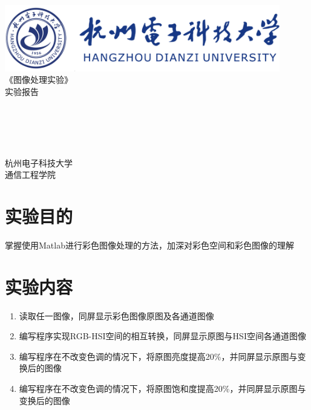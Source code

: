 \documentclass[a4paper]{ctexart}
\begin{document}
  \begin{titlepage}
      \songti
      \begin{center}
        \includegraphics[width=0.9\textwidth]{../HDU.png}\\
        \vspace*{2.5cm}
        {\fontsize{24pt}{0}
          《图像处理实验》\\
          \fontsize{36pt}{0}
          \vspace*{1cm}
          实验报告\\
        }
        \vspace*{3cm}
        {\fontsize{18pt}{0}
           \\
          \vspace*{2cm}
           \\
          \vspace*{0.5cm}
           \\
          \vspace*{0.5cm}
           \\
          \vspace*{0.5cm}
           \\
          \vspace*{5cm}
          杭州电子科技大学\\通信工程学院
        }
      \end{center}
  \end{titlepage}


  \newpage
  \section{实验目的}
  掌握使用Matlab进行彩色图像处理的方法，加深对彩色空间和彩色图像的理解

  \section{实验内容}
  \begin{enumerate}
    \item 读取任一图像，同屏显示彩色图像原图及各通道图像
    \item 编写程序实现RGB-HSI空间的相互转换，同屏显示原图与HSI空间各通道图像
    \item 编写程序在不改变色调的情况下，将原图亮度提高20\%，并同屏显示原图与变换后的图像
    \item 编写程序在不改变色调的情况下，将原图饱和度提高20\%，并同屏显示原图与变换后的图像
  \end{enumerate}
\end{document}
